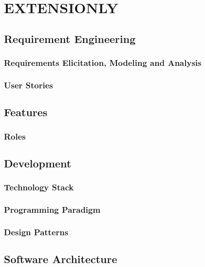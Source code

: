 \chapter{EXTENSIONLY}\label{extensionly}

\section{Requirement Engineering}
\subsection{Requirements Elicitation, Modeling and Analysis}
\subsection{User Stories}

\section{Features}

\subsection{Roles}

\section{Development}
\subsection{Technology Stack}
\subsection{Programming Paradigm}
\subsection{Design Patterns}


\section{Software Architecture}
